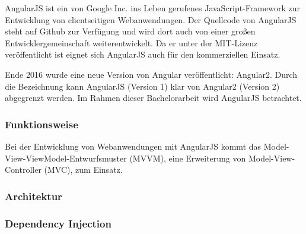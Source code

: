 AngularJS ist ein von Google Inc. ins Leben gerufenes JavaScript-Framework zur Entwicklung von clientseitigen Webanwendungen\cite{angular-faq}. Der Quellcode von AngularJS steht auf Github zur Verfügung und wird dort auch von einer großen Entwicklergemeinschaft weiterentwickelt\cite[][9]{ng-book}. Da er unter der MIT-Lizenz veröffentlicht ist eignet sich AngularJS auch für den kommerziellen Einsatz\cites[9]{ng-book}[]{mit-license}.

Ende 2016 wurde eine neue Version von Angular veröffentlicht: Angular2\cite{ng2-out}. Durch die Bezeichnung kann AngularJS (Version 1) klar von Angular2 (Version 2) abgegrenzt werden. Im Rahmen dieser Bachelorarbeit wird AngularJS betrachtet.

\subsubsection{Funktionsweise}
Bei der Entwicklung von Webanwendungen mit AngularJS kommt das Model-View-ViewModel-Entwurfsmuster (MVVM), eine Erweiterung von Model-View-Controller (MVC), zum Einsatz. 

\subsubsection{Architektur}


\subsubsection{Dependency Injection}